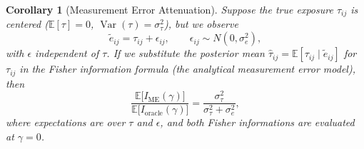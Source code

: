 \documentclass[11pt,a4paper]{article}
\newtheorem{corollary}[theorem]{Corollary}
\theoremstyle{definition}
\DeclareMathOperator{\Var}{Var}
\begin{document}
\begin{corollary}[Measurement Error Attenuation]\label{cor:me}
Suppose the true exposure $\tau_{ij}$ is centered
($\mathbb{E}[\tau]=0$, $\Var(\tau)=\sigma_\tau^2$),
but we observe
\begin{equation}\label{eq:me_model}
  \tilde{e}_{ij} = \tau_{ij} + \epsilon_{ij},
  \qquad \epsilon_{ij}\sim N(0,\sigma_e^2),
\end{equation}
with $\epsilon$ independent of $\tau$.
If we substitute the posterior mean
$\hat{\tau}_{ij} = \mathbb{E}[\tau_{ij}\mid\tilde{e}_{ij}]$
for $\tau_{ij}$ in the Fisher information formula
(the analytical measurement error model), then
\begin{equation}\label{eq:me_ratio}
  \frac{\mathbb{E}\bigl[I_{\mathrm{ME}}(\gamma)\bigr]}
       {\mathbb{E}\bigl[I_{\mathrm{oracle}}(\gamma)\bigr]}
  = \frac{\sigma_\tau^2}{\sigma_\tau^2+\sigma_e^2},
\end{equation}
where expectations are over $\tau$ and $\epsilon$,
and both Fisher informations are evaluated at $\gamma=0$.
\end{corollary}
\end{document}
